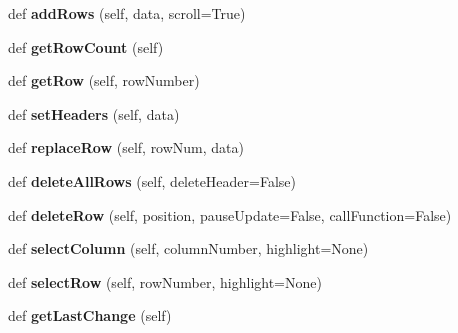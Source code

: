 \begin{DoxyCompactItemize}
\mbox{\label{classappjar_1_1_simple_table_af8ab42c543d7a91b4298cd7909d7b6c8}} 
def {\bfseries add\+Rows} (self, data, scroll=True)
\item 
\mbox{\label{classappjar_1_1_simple_table_a5703853e76c86dc9a951de0898c37aab}} 
def {\bfseries get\+Row\+Count} (self)
\item 
\mbox{\label{classappjar_1_1_simple_table_af1e99a3ac5cdd8bbb1ea974ade2bda8d}} 
def {\bfseries get\+Row} (self, row\+Number)
\item 
\mbox{\label{classappjar_1_1_simple_table_a3ebd0034b18adccebb4ae4b651ddf3e5}} 
def {\bfseries set\+Headers} (self, data)
\item 
\mbox{\label{classappjar_1_1_simple_table_aeb9a0ca2f9cc7b4b081ad3b22c5f0e0a}} 
def {\bfseries replace\+Row} (self, row\+Num, data)
\item 
\mbox{\label{classappjar_1_1_simple_table_accea87671d25bd987a669aeaccca69bf}} 
def {\bfseries delete\+All\+Rows} (self, delete\+Header=False)
\item 
\mbox{\label{classappjar_1_1_simple_table_a4cbeff57c9b54e932655393d19da3c36}} 
def {\bfseries delete\+Row} (self, position, pause\+Update=False, call\+Function=False)
\item 
\mbox{\label{classappjar_1_1_simple_table_a5d7ff75602afed2442c313c3e62a29ae}} 
def {\bfseries select\+Column} (self, column\+Number, highlight=None)
\item 
\mbox{\label{classappjar_1_1_simple_table_ae0131c514a31cf84645f42233771a13c}} 
def {\bfseries select\+Row} (self, row\+Number, highlight=None)
\item 
\mbox{\label{classappjar_1_1_simple_table_a97d22e0ee5a35c29582bdc0fb2197d4a}} 
def {\bfseries get\+Last\+Change} (self)
\item 
\mbox{\label{classappjar_1_1_simple_table_a82b6fe14da7d117fd0630ccb52fce78b}} 

\end{DoxyCompactItemize}

